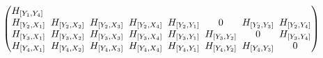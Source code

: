 \documentclass[11pt]{article}
\numberwithin{equation}{section}
\numberwithin{equation}{section}
\theoremstyle{definition}
\newcommand{\0}{\boldsymbol{0}}
\begin{document}
\begin{gather*}
\begin{pmatrix}
H_{[Y_1, Y_4]}
\\
H_{[Y_2, X_1]} \hspace{-2.3pt}&\hspace{-2.3pt} H_{[Y_2, X_2]} \hspace{-2.3pt}&\hspace{-2.3pt} H_{[Y_2, X_3]} \hspace{-2.3pt}&\hspace{-2.3pt} H_{[Y_2, X_4]} \hspace{-2.3pt}&\hspace{-2.3pt} H_{[Y_2, Y_1]} \hspace{-2.3pt}&\hspace{-2.3pt} 0 \hspace{-2.3pt}&\hspace{-2.3pt} H_{[Y_2, Y_3]} \hspace{-2.3pt}&\hspace{-2.3pt}
H_{[Y_2, Y_4]}
\\
H_{[Y_3, X_1]} \hspace{-2.3pt}&\hspace{-2.3pt} H_{[Y_3, X_2]} \hspace{-2.3pt}&\hspace{-2.3pt} H_{[Y_3, X_3]} \hspace{-2.3pt}&\hspace{-2.3pt} H_{[Y_3, X_4]} \hspace{-2.3pt}&\hspace{-2.3pt} H_{[Y_3, Y_1]} \hspace{-2.3pt}&\hspace{-2.3pt} H_{[Y_3, Y_2]} \hspace{-2.3pt}&\hspace{-2.3pt} 0 \hspace{-2.3pt}&\hspace{-2.3pt}
H_{[Y_3, Y_4]}
\\
H_{[Y_4, X_1]} \hspace{-2.3pt}&\hspace{-2.3pt} H_{[Y_4, X_2]} \hspace{-2.3pt}&\hspace{-2.3pt} H_{[Y_4, X_3]} \hspace{-2.3pt}&\hspace{-2.3pt} H_{[Y_4, X_4]} \hspace{-2.3pt}&\hspace{-2.3pt} H_{[Y_4, Y_1]} \hspace{-2.3pt}&\hspace{-2.3pt} H_{[Y_4, Y_2]} \hspace{-2.3pt}&\hspace{-2.3pt} H_{[Y_4, Y_3]} \hspace{-2.3pt}&\hspace{-2.3pt} 0

\end{pmatrix}
\end{gather*}
\end{document}
